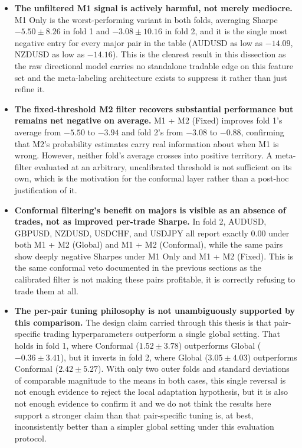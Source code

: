 \documentclass[12pt, a4paper]{article}
\begin{document}
\begin{itemize}
\item \textbf{The unfiltered M1 signal is actively harmful, not merely mediocre.} M1 Only is the worst-performing variant in both folds, averaging Sharpe $-5.50 \pm 8.26$ in fold 1 
and $-3.08 \pm 10.16$ in fold 2, and it is the single most negative entry for every major pair in the table (AUDUSD as low as $-14.09$, NZDUSD as low as $-14.16$). This is the 
clearest result in this dissection as the raw directional model carries no standalone tradable edge on this feature set and the meta-labeling architecture exists to suppress it 
rather than just refine it.

\item \textbf{The fixed-threshold M2 filter recovers substantial performance but remains net negative on average.} M1 + M2 (Fixed) improves fold 1's average from $-5.50$ to 
$-3.94$ and fold 2's from $-3.08$ to $-0.88$, confirming that M2's probability estimates carry real information about when M1 is wrong. However, neither fold's average crosses 
into positive territory. A meta-filter evaluated at an arbitrary, uncalibrated threshold is not sufficient on its own, which is the motivation for the conformal layer rather 
than a post-hoc justification of it.

\item \textbf{Conformal filtering's benefit on majors is visible as an absence of trades, not as improved per-trade Sharpe.} In fold 2, AUDUSD, GBPUSD, NZDUSD, USDCHF, and 
USDJPY all report exactly $0.00$ under both M1 + M2 (Global) and M1 + M2 (Conformal), while the same pairs show deeply negative Sharpes under M1 Only and M1 + M2 (Fixed). This 
is the same conformal veto documented in the previous sections as the calibrated filter is not making these pairs profitable, it is correctly refusing to trade them at all.

\item \textbf{The per-pair tuning philosophy is not unambiguously supported by this comparison.} The design claim carried through this thesis is that pair-specific trading 
hyperparameters outperform a single global setting. That holds in fold 1, where Conformal ($1.52 \pm 3.78$) outperforms Global ($-0.36 \pm 3.41$), but it inverts in fold 2, where 
Global ($3.05 \pm 4.03$) outperforms Conformal ($2.42 \pm 5.27$). With only two outer folds and standard deviations of comparable magnitude to the means in both cases, this 
single reversal is not enough evidence to reject the local adaptation hypothesis, but it is also not enough evidence to confirm it and we do not think the results here support 
a stronger claim than that pair-specific tuning is, at best, inconsistently better than a simpler global setting under this evaluation protocol.
\end{itemize}
\end{document}
